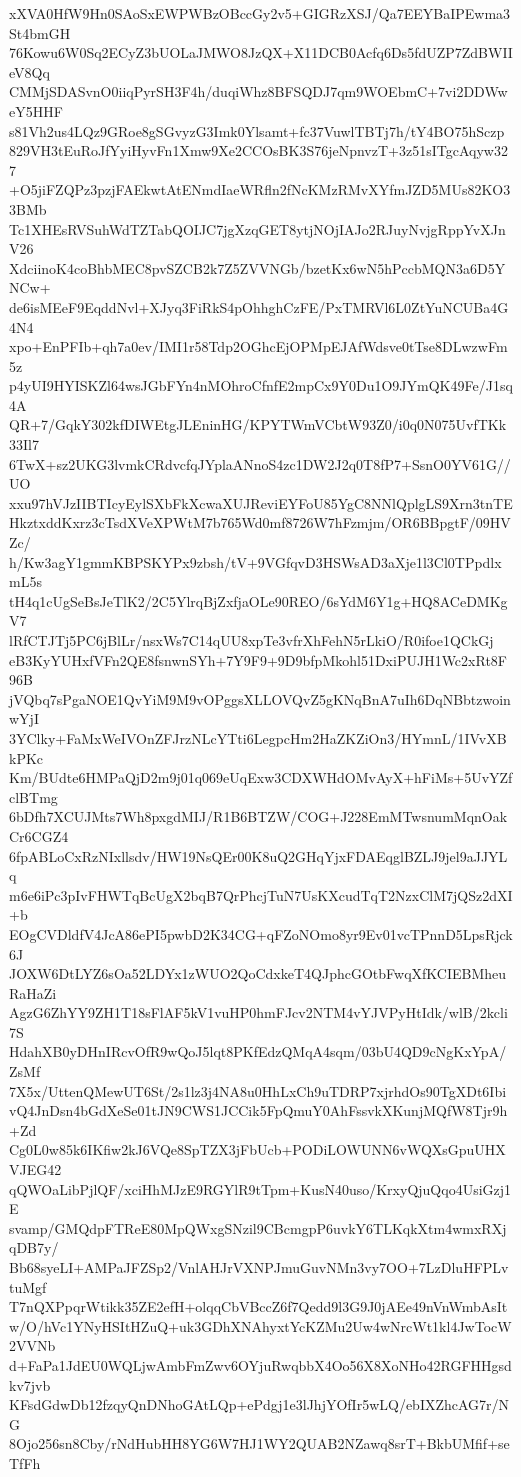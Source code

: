 xXVA0HfW9Hn0SAoSxEWPWBzOBccGy2v5+GIGRzXSJ/Qa7EEYBaIPEwma3St4bmGH
76Kowu6W0Sq2ECyZ3bUOLaJMWO8JzQX+X11DCB0Acfq6Ds5fdUZP7ZdBWIIeV8Qq
CMMjSDASvnO0iiqPyrSH3F4h/duqiWhz8BFSQDJ7qm9WOEbmC+7vi2DDWweY5HHF
s81Vh2us4LQz9GRoe8gSGvyzG3Imk0Ylsamt+fc37VuwlTBTj7h/tY4BO75hSczp
829VH3tEuRoJfYyiHyvFn1Xmw9Xe2CCOsBK3S76jeNpnvzT+3z51sITgcAqyw327
+O5jiFZQPz3pzjFAEkwtAtENmdIaeWRfln2fNcKMzRMvXYfmJZD5MUs82KO33BMb
Tc1XHEsRVSuhWdTZTabQOIJC7jgXzqGET8ytjNOjIAJo2RJuyNvjgRppYvXJnV26
XdciinoK4coBhbMEC8pvSZCB2k7Z5ZVVNGb/bzetKx6wN5hPccbMQN3a6D5YNCw+
de6isMEeF9EqddNvl+XJyq3FiRkS4pOhhghCzFE/PxTMRVl6L0ZtYuNCUBa4G4N4
xpo+EnPFIb+qh7a0ev/IMI1r58Tdp2OGhcEjOPMpEJAfWdsve0tTse8DLwzwFm5z
p4yUI9HYISKZl64wsJGbFYn4nMOhroCfnfE2mpCx9Y0Du1O9JYmQK49Fe/J1sq4A
QR+7/GqkY302kfDIWEtgJLEninHG/KPYTWmVCbtW93Z0/i0q0N075UvfTKk33Il7
6TwX+sz2UKG3lvmkCRdvcfqJYplaANnoS4zc1DW2J2q0T8fP7+SsnO0YV61G//UO
xxu97hVJzIIBTIcyEylSXbFkXcwaXUJReviEYFoU85YgC8NNlQplgLS9Xrn3tnTE
HkztxddKxrz3cTsdXVeXPWtM7b765Wd0mf8726W7hFzmjm/OR6BBpgtF/09HVZc/
h/Kw3agY1gmmKBPSKYPx9zbsh/tV+9VGfqvD3HSWsAD3aXje1l3Cl0TPpdlxmL5s
tH4q1cUgSeBsJeTlK2/2C5YlrqBjZxfjaOLe90REO/6sYdM6Y1g+HQ8ACeDMKgV7
lRfCTJTj5PC6jBlLr/nsxWs7C14qUU8xpTe3vfrXhFehN5rLkiO/R0ifoe1QCkGj
eB3KyYUHxfVFn2QE8fsnwnSYh+7Y9F9+9D9bfpMkohl51DxiPUJH1Wc2xRt8F96B
jVQbq7sPgaNOE1QvYiM9M9vOPggsXLLOVQvZ5gKNqBnA7uIh6DqNBbtzwoinwYjI
3YClky+FaMxWeIVOnZFJrzNLcYTti6LegpcHm2HaZKZiOn3/HYmnL/1IVvXBkPKc
Km/BUdte6HMPaQjD2m9j01q069eUqExw3CDXWHdOMvAyX+hFiMs+5UvYZfclBTmg
6bDfh7XCUJMts7Wh8pxgdMIJ/R1B6BTZW/COG+J228EmMTwsnumMqnOakCr6CGZ4
6fpABLoCxRzNIxllsdv/HW19NsQEr00K8uQ2GHqYjxFDAEqglBZLJ9jel9aJJYLq
m6e6iPc3pIvFHWTqBcUgX2bqB7QrPhcjTuN7UsKXcudTqT2NzxClM7jQSz2dXI+b
EOgCVDldfV4JcA86ePI5pwbD2K34CG+qFZoNOmo8yr9Ev01vcTPnnD5LpsRjck6J
JOXW6DtLYZ6sOa52LDYx1zWUO2QoCdxkeT4QJphcGOtbFwqXfKCIEBMheuRaHaZi
AgzG6ZhYY9ZH1T18sFlAF5kV1vuHP0hmFJcv2NTM4vYJVPyHtIdk/wlB/2kcli7S
HdahXB0yDHnIRcvOfR9wQoJ5lqt8PKfEdzQMqA4sqm/03bU4QD9cNgKxYpA/ZsMf
7X5x/UttenQMewUT6St/2s1lz3j4NA8u0HhLxCh9uTDRP7xjrhdOs90TgXDt6Ibi
vQ4JnDsn4bGdXeSe01tJN9CWS1JCCik5FpQmuY0AhFssvkXKunjMQfW8Tjr9h+Zd
Cg0L0w85k6IKfiw2kJ6VQe8SpTZX3jFbUcb+PODiLOWUNN6vWQXsGpuUHXVJEG42
qQWOaLibPjlQF/xciHhMJzE9RGYlR9tTpm+KusN40uso/KrxyQjuQqo4UsiGzj1E
svamp/GMQdpFTReE80MpQWxgSNzil9CBcmgpP6uvkY6TLKqkXtm4wmxRXjqDB7y/
Bb68syeLI+AMPaJFZSp2/VnlAHJrVXNPJmuGuvNMn3vy7OO+7LzDluHFPLvtuMgf
T7nQXPpqrWtikk35ZE2efH+olqqCbVBccZ6f7Qedd9l3G9J0jAEe49nVnWmbAsIt
w/O/hVc1YNyHSItHZuQ+uk3GDhXNAhyxtYcKZMu2Uw4wNrcWt1kl4JwTocW2VVNb
d+FaPa1JdEU0WQLjwAmbFmZwv6OYjuRwqbbX4Oo56X8XoNHo42RGFHHgsdkv7jvb
KFsdGdwDb12fzqyQnDNhoGAtLQp+ePdgj1e3lJhjYOfIr5wLQ/ebIXZhcAG7r/NG
8Ojo256sn8Cby/rNdHubHH8YG6W7HJ1WY2QUAB2NZawq8srT+BkbUMfif+seTfFh
